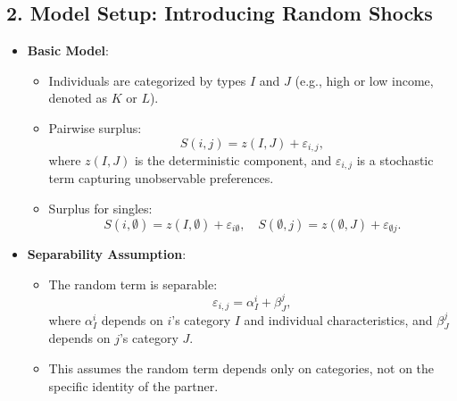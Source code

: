 \subsection*{2. Model Setup: Introducing Random Shocks}
\begin{itemize}
    \item \textbf{Basic Model}:
    \begin{itemize}
        \item Individuals are categorized by types \( I \) and \( J \) (e.g., high or low income, denoted as \( K \) or \( L \)).
        \item Pairwise surplus: 
        \[
        S(i, j) = z(I, J) + \varepsilon_{i,j},
        \]
        where \( z(I, J) \) is the deterministic component, and \( \varepsilon_{i,j} \) is a stochastic term capturing unobservable preferences.
        \item Surplus for singles: 
        \[
        S(i, \emptyset) = z(I, \emptyset) + \varepsilon_{i\emptyset}, \quad S(\emptyset, j) = z(\emptyset, J) + \varepsilon_{\emptyset j}.
        \]
    \end{itemize}
    \item \textbf{Separability Assumption}:
    \begin{itemize}
        \item The random term is separable: 
        \[
        \varepsilon_{i,j} = \alpha_I^i + \beta_J^j,
        \]
        where \( \alpha_I^i \) depends on \( i \)'s category \( I \) and individual characteristics, and \( \beta_J^j \) depends on \( j \)'s category \( J \).
        \item This assumes the random term depends only on categories, not on the specific identity of the partner.
    \end{itemize}
\end{itemize}

